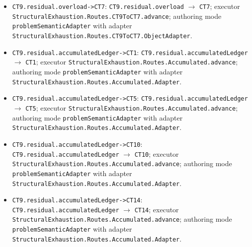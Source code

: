 \begin{itemize}
\item \texttt{CT9.\allowbreak{}residual.\allowbreak{}overload-\allowbreak{}>CT7}: \texttt{CT9.\allowbreak{}residual.\allowbreak{}overload} $\to$ \texttt{CT7}; executor \texttt{Structural\allowbreak{}Exhaustion.\allowbreak{}Routes.\allowbreak{}CT9\allowbreak{}To\allowbreak{}CT7.\allowbreak{}advance}; authoring mode \texttt{problem\allowbreak{}Semantic\allowbreak{}Adapter} with adapter \texttt{Structural\allowbreak{}Exhaustion.\allowbreak{}Routes.\allowbreak{}CT9\allowbreak{}To\allowbreak{}CT7.\allowbreak{}Object\allowbreak{}Adapter}.
\item \texttt{CT9.\allowbreak{}residual.\allowbreak{}accumulated\allowbreak{}Ledger-\allowbreak{}>CT1}: \texttt{CT9.\allowbreak{}residual.\allowbreak{}accumulated\allowbreak{}Ledger} $\to$ \texttt{CT1}; executor \texttt{Structural\allowbreak{}Exhaustion.\allowbreak{}Routes.\allowbreak{}Accumulated.\allowbreak{}advance}; authoring mode \texttt{problem\allowbreak{}Semantic\allowbreak{}Adapter} with adapter \texttt{Structural\allowbreak{}Exhaustion.\allowbreak{}Routes.\allowbreak{}Accumulated.\allowbreak{}Adapter}.
\item \texttt{CT9.\allowbreak{}residual.\allowbreak{}accumulated\allowbreak{}Ledger-\allowbreak{}>CT5}: \texttt{CT9.\allowbreak{}residual.\allowbreak{}accumulated\allowbreak{}Ledger} $\to$ \texttt{CT5}; executor \texttt{Structural\allowbreak{}Exhaustion.\allowbreak{}Routes.\allowbreak{}Accumulated.\allowbreak{}advance}; authoring mode \texttt{problem\allowbreak{}Semantic\allowbreak{}Adapter} with adapter \texttt{Structural\allowbreak{}Exhaustion.\allowbreak{}Routes.\allowbreak{}Accumulated.\allowbreak{}Adapter}.
\item \texttt{CT9.\allowbreak{}residual.\allowbreak{}accumulated\allowbreak{}Ledger-\allowbreak{}>CT10}: \texttt{CT9.\allowbreak{}residual.\allowbreak{}accumulated\allowbreak{}Ledger} $\to$ \texttt{CT10}; executor \texttt{Structural\allowbreak{}Exhaustion.\allowbreak{}Routes.\allowbreak{}Accumulated.\allowbreak{}advance}; authoring mode \texttt{problem\allowbreak{}Semantic\allowbreak{}Adapter} with adapter \texttt{Structural\allowbreak{}Exhaustion.\allowbreak{}Routes.\allowbreak{}Accumulated.\allowbreak{}Adapter}.
\item \texttt{CT9.\allowbreak{}residual.\allowbreak{}accumulated\allowbreak{}Ledger-\allowbreak{}>CT14}: \texttt{CT9.\allowbreak{}residual.\allowbreak{}accumulated\allowbreak{}Ledger} $\to$ \texttt{CT14}; executor \texttt{Structural\allowbreak{}Exhaustion.\allowbreak{}Routes.\allowbreak{}Accumulated.\allowbreak{}advance}; authoring mode \texttt{problem\allowbreak{}Semantic\allowbreak{}Adapter} with adapter \texttt{Structural\allowbreak{}Exhaustion.\allowbreak{}Routes.\allowbreak{}Accumulated.\allowbreak{}Adapter}.
\end{itemize}
\endgroup
